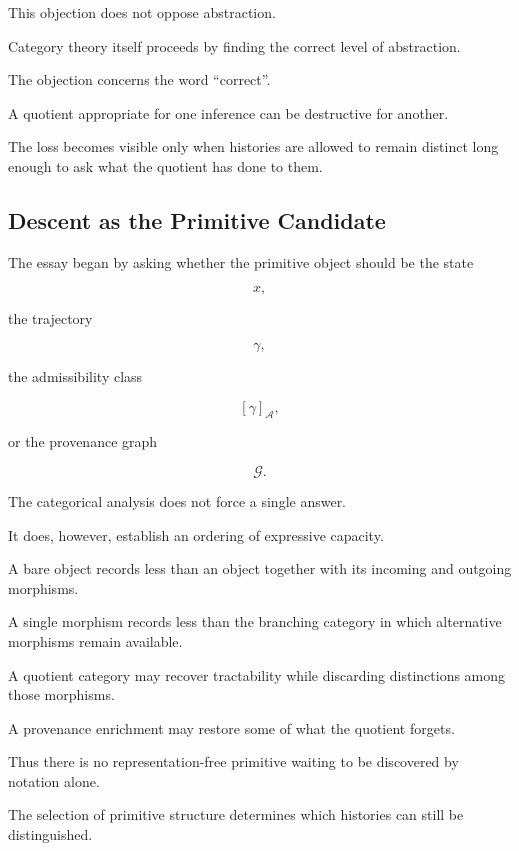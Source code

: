 \documentclass[
  11pt,
  a4paper,
  DIV=12,
  BCOR=0mm,
  parskip=half-
]{scrartcl}
\newcommand{\graphG}{\mathcal G}
\theoremstyle{definition}
\theoremstyle{plain}
\theoremstyle{remark}
\begin{document}
This objection does not oppose abstraction.

Category theory itself proceeds by finding the correct level of abstraction.

The objection concerns the word \enquote{correct}.

A quotient appropriate for one inference can be destructive for another.

The loss becomes visible only when histories are allowed to remain distinct
long enough to ask what the quotient has done to them.


\subsection{Descent as the Primitive Candidate}
\label{app:descent-primitive}

The essay began by asking whether the primitive object should be the state

\[
  x,
\]

the trajectory

\[
  \gamma,
\]

the admissibility class

\[
  [\gamma]_{\mathcal A},
\]

or the provenance graph

\[
  \graphG.
\]

The categorical analysis does not force a single answer.

It does, however, establish an ordering of expressive capacity.

A bare object records less than an object together with its incoming and
outgoing morphisms.

A single morphism records less than the branching category in which alternative
morphisms remain available.

A quotient category may recover tractability while discarding distinctions
among those morphisms.

A provenance enrichment may restore some of what the quotient forgets.

Thus there is no representation-free primitive waiting to be discovered by
notation alone.

The selection of primitive structure determines which histories can still be
distinguished.
\end{document}
